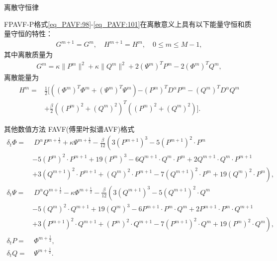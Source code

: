 \documentclass[aspectratio=169]{beamer}
\numberwithin{theorem}{section} %
\begin{document}
\begin{frame}{离散守恒律}
	\begin{theorem}\label{thm_PAVF:4}
		FPAVF-P格式\eqref{eq_PAVF:98}-\eqref{eq_PAVF:101}在离散意义上具有以下能量守恒和质量守恒的特性：
		\begin{align}\label{eq_PAVF:11141}
		G^{m+1}=G^{m}, \quad H^{m+1}=H^{m}, \quad 0 \leq m \leq M-1,
		\end{align}
		其中离散质量为
		\begin{align}\label{eq_PAVF:11142}
		G^{m}=\kappa\|P^{m}\|^2+\kappa\|Q^{m}\|^2+2 \left(\Psi^{m}\right)^T P^{m}-2 \left(\varPhi^{m}\right)^T Q^{m},
		\end{align}
		离散能量为
		\begin{align}
		H^{m}=&\frac{1}{2}[((\varPhi^{m})^{T}\varPhi^{m}+(\Psi^{m})^{T}\Psi^{m}){-(P^{m})^{T} D^{\alpha} P^{m}-(Q^{m})^{T} D^{\alpha} Q^{m}}\nonumber\\
		&+\frac{\beta}{2}((P^{m})^2+(Q^{m})^2)^{T}((P^{m})^2+(Q^{m})^2)].\label{eq_PAVF:800}
		\end{align}
		\end{theorem}
\end{frame}
\begin{frame}{其他数值方法}
	FAVF(傅里叶拟谱AVF)格式
	\begin{align}
	\delta_{t} \varPhi =&~{D^{\alpha} P^{m+\frac{1}{2}}}+\kappa \Psi^{m+\frac{1}{2}}-\frac{\beta}{12}\left(3 (P^{m+1})^3-5 (P^{m+1})^2\cdot P^{m}\right.\nonumber\\
			&-5 (P^{m})^2\cdot P^{m+1}+19 (P^{m})^3-6 Q^{m+1}\cdot Q^{m}\cdot P^{m}+2 Q^{m+1}\cdot Q^{m}\cdot P^{m+1} \nonumber\\
			&+\left. 3 (Q^{m+1})^2\cdot P^{m+1}+(Q^{m})^2\cdot P^{m+1}-7 (Q^{m+1})^2\cdot P^{m}+19 (Q^{m} )^2\cdot P^{m}\right),\label{eq_PAVF:66}\\
	\delta_{t} \Psi =&~{D^{\alpha} Q^{m+\frac{1}{2}}}-\kappa \varPhi^{m+\frac{1}{2}}-\frac{\beta}{12}\left(3 (Q^{m+1})^3-5 (Q^{m+1})^2\cdot Q^{m}\right.\nonumber\\
			&-5 (Q^{m})^2\cdot Q^{m+1}+19 (Q^{m})^3-6 P^{m+1}\cdot P^{m}\cdot Q^{m}+2 P^{m+1}\cdot P^{m}\cdot Q^{m+1} \nonumber\\
			&+\left. 3 (P^{m+1})^2\cdot Q^{m+1}+(P^{m})^2\cdot Q^{m+1}-7 (P^{m+1})^2\cdot Q^{m}+19 (P^{m} )^2\cdot Q^{m}\right),\label{eq_PAVF:67}\\
	\delta_{t} P=&~\varPhi^{m+\frac{1}{2}},\label{eq_PAVF:68}\\
	\delta_{t} Q=&~\Psi^{m+\frac{1}{2}}.\label{eq_PAVF:69}
	\end{align}
\end{frame}
\end{document}
